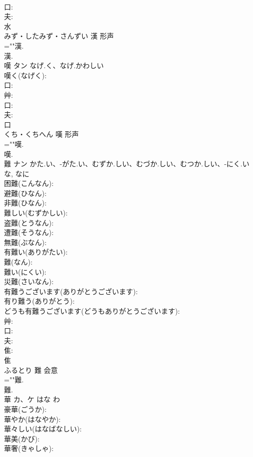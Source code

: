 \documentclass[8pt]{extreport}
\begin{document}
\begin{CJK}{UTF8}{min}
\\	口: 
\\	夫: 
\\	水	
\\	みず・したみず・さんずい	漢	形声 
\\	=""漢.
\\	漢.
\\	嘆	タン	なげ.く、なげ.かわしい		
\\	嘆く(なげく): 
\\	口: 
\\	艸: 
\\	口: 
\\	夫: 
\\	口	
\\	くち・くちへん	嘆	形声 
\\	=""嘆.
\\	嘆.
\\	難	ナン	かた.い、-がた.い、むずか.しい、むづか.しい、むつか.しい、-にく.い	な, なに	
\\	困難(こんなん): 
\\	避難(ひなん): 
\\	非難(ひなん): 
\\	難しい(むずかしい): 
\\	盗難(とうなん): 
\\	遭難(そうなん): 
\\	無難(ぶなん): 
\\	有難い(ありがたい): 
\\	難(なん): 
\\	難い(にくい): 
\\	災難(さいなん): 
\\	有難うございます(ありがとうございます): 
\\	有り難う(ありがとう): 
\\	どうも有難うございます(どうもありがとうございます): 
\\	艸: 
\\	口: 
\\	夫: 
\\	隹: 
\\	隹	
\\	ふるとり	難	会意 
\\	=""難.
\\	難.
\\	華	カ、ケ	はな	わ	
\\	豪華(ごうか): 
\\	華やか(はなやか): 
\\	華々しい(はなばなしい): 
\\	華美(かび): 
\\	華奢(きゃしゃ): 

\end{CJK}
\end{document}
